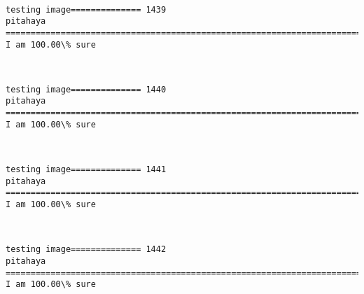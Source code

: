 \documentclass[11pt]{article}
\begin{document}
    \begin{center}
    \end{center}
    { \hspace*{\fill} \\}
    
    \begin{Verbatim}[commandchars=\\\{\}]
testing image============== 1439
pitahaya
============================================================================
I am 100.00\% sure

    \end{Verbatim}

    \begin{center}
    \end{center}
    { \hspace*{\fill} \\}
    
    \begin{Verbatim}[commandchars=\\\{\}]
testing image============== 1440
pitahaya
============================================================================
I am 100.00\% sure

    \end{Verbatim}

    \begin{center}
    \end{center}
    { \hspace*{\fill} \\}
    
    \begin{Verbatim}[commandchars=\\\{\}]
testing image============== 1441
pitahaya
============================================================================
I am 100.00\% sure

    \end{Verbatim}

    \begin{center}
    \end{center}
    { \hspace*{\fill} \\}
    
    \begin{Verbatim}[commandchars=\\\{\}]
testing image============== 1442
pitahaya
============================================================================
I am 100.00\% sure

    \end{Verbatim}
\end{document}
